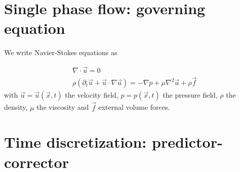 \documentclass[a4paper,11pt]{report}
\begin{document}
\section*{Single phase flow: governing equation}

We write Navier-Stokes equations as

\begin{equation}
    \label{eqn:NavierStokes}
    \begin{aligned}
        &\nabla \cdot \vec{u} = 0 \\
        &\rho\left(\partial_t \vec{u} + \vec{u} \cdot \nabla \vec{u}\right) = -\nabla p + \mu \nabla^2 \vec{u} + \rho \vec{f}
    \end{aligned}
\end{equation}
%
with $\vec{u} = \vec{u}\left(\vec{x},t\right)$ the velocity field, $p = p(\vec{x},t)$ the pressure field, $\rho$ the density,
$\mu$ the viscosity and $\vec{f}$ external volume forces.

\section*{Time discretization: predictor-corrector}
\end{document}
